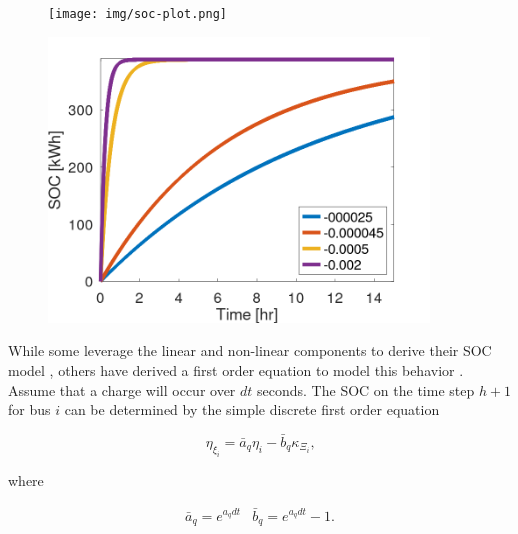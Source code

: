 \documentclass[ee,thesis]{usuthesis}
\begin{document}
\begin{figure}

  \begin{minipage}{0.5\textwidth}
    \centering
    \texttt{[image: img/soc-plot.png]}
    \label{fig:soc-plot}
  \end{minipage}%
  \begin{minipage}{0.5\textwidth}
    \centering
    \includegraphics[width=0.9\textwidth]{img/nonlinear-bat.png}
    \label{fig:convergence-rates}
  \end{minipage}

\end{figure}

While some leverage the linear and non-linear components to derive their SOC model \cite{abdollahi-2016-optim-batter},
others have derived a first order equation to model this behavior \cite{whitaker-2023-a-network}. Assume that a charge
will occur over \(dt\) seconds. The SOC on the time step \(h+1\) for bus \(i\) can be determined by the simple discrete first
order equation

\begin{equation}
  \eta_{\xi_i} = \bar{a}_q \eta_i - \bar{b}_q \kappa_{\Xi_i}\text{,}
\end{equation}

where

\begin{equation}
\begin{array}{cc}
  \bar{a}_q = e^{a_q dt} & \bar{b}_q = e^{a_q dt} - 1\text{.}
\end{array}
\end{equation}
\end{document}
